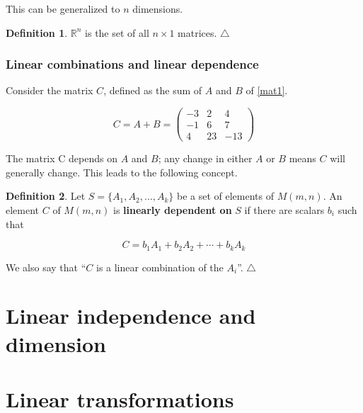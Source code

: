 \documentclass[12pt,a4paper,oneside]{book}
\newcommand\xqed[1]{%
  \leavevmode\unskip\penalty9999 \hbox{}\nobreak\hfill
  \quad\hbox{#1}}
\newcommand\demo{\xqed{$\triangle$}}
\theoremstyle{definition}
\newtheorem{definition}{Definition}[chapter]
\theoremstyle{plain}
\begin{document}
This can be generalized to $n$ dimensions.

\begin{definition}
$\mathbb{R}^n$ is the set of all $n \times 1$ matrices.
\demo  
\end{definition}

\subsection{Linear combinations and linear dependence}

Consider the matrix $C$, defined as the sum of $A$ and $B$ of \ref{mat1}.

\begin{equation}
C = A + B = \begin{pmatrix} -3 & 2 & 4 \\ -1 & 6 & 7 \\ 4 & 23 & -13\end{pmatrix} 
\end{equation}

The matrix C depends on $A$ and $B$; any change in either $A$ or $B$ means $C$ will generally change. This leads to the following concept.

\begin{definition}
Let $S = \{A_1,A_2,\ldots,A_k\}$ be a set of elements of $M(m,n)$. An element $C$ of $M(m,n)$ is \textbf{linearly dependent on} $S$ if there are scalars $b_i$ such that

\begin{equation}
C = b_1 A_1 + b_2 A_2 + \cdots + b_k A_k
\end{equation}

We also say that ``$C$ is a linear combination of the $A_i$''. 
\demo  
\end{definition}



\chapter{Linear independence and dimension}
\chapter{Linear transformations}
\end{document}
